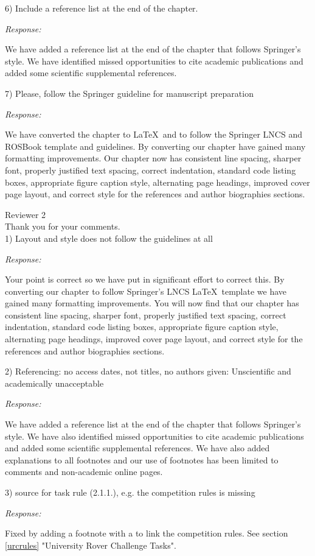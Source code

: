 \documentclass[runningheads,a4paper]{llncs}
\newcommand{\rsp}{\noindent \textit{Response:}}
\newcommand{\rev}[1]{
\newpage
\noindent Reviewer {#1}\\

\noindent Thank you for your comments.\\
}
\begin{document}
6)  Include a reference list at the end of the chapter.

\rsp

We have added a reference list at the end of the chapter that follows Springer's style. We have identified missed opportunities to cite academic publications and added some scientific supplemental references. 

7)  Please, follow the Springer guideline for manuscript preparation

\rsp

We have converted the chapter to \LaTeX\  and to follow the Springer LNCS and ROSBook template and guidelines. By converting our chapter have gained many formatting improvements. Our chapter now has consistent line spacing, sharper font, properly justified text spacing, correct indentation, standard code listing boxes, appropriate figure caption style, alternating page headings, improved cover page layout, and correct style for the references and author biographies sections.

\rev{2}

1)  Layout and style does not follow the guidelines at all

\rsp

Your point is correct so we have put in significant effort to correct this. By converting our chapter to follow Springer's LNCS \LaTeX\ template we have gained many formatting improvements. You will now find that our chapter has consistent line spacing, sharper font, properly justified text spacing, correct indentation, standard code listing boxes, appropriate figure caption style, alternating page headings, improved cover page layout, and correct style for the references and author biographies sections.

2)  Referencing: no access dates, not titles, no authors given: Unscientific and academically unacceptable

\rsp

We have added a reference list at the end of the chapter that follows Springer's style. We have also identified missed opportunities to cite academic publications and added some scientific supplemental references. We have also added explanations to all footnotes and our use of footnotes has been limited to comments and non-academic online pages.

3)  source for task rule (2.1.1.), e.g. the competition rules is missing

\rsp

Fixed by adding a footnote with a to link the competition rules. See section \ref{urcrules} "University Rover Challenge Tasks".
\end{document}
